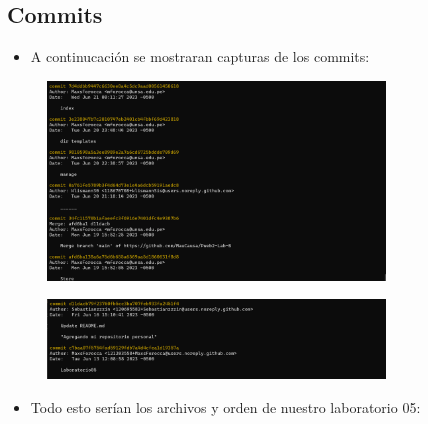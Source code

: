 \subsection{Commits}
\begin{itemize}	
	\item A continucación se mostraran capturas de los commits:
\end{itemize}	
\begin{figure}[H]
	\centering
	\includegraphics[width=0.8\textwidth,keepaspectratio]{img/commits1.png}
\end{figure}
\begin{figure}[H]
	\centering
	\includegraphics[width=0.8\textwidth,keepaspectratio]{img/commits2.png}
\end{figure}
\begin{itemize}	
	\item Todo esto serían los archivos y orden de nuestro laboratorio 05:
\end{itemize}	
